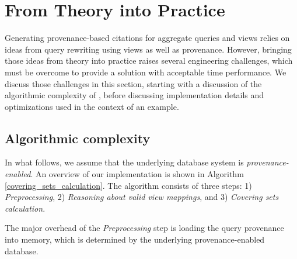 \section{From Theory into Practice}\label{Sec: implementation}
Generating provenance-based citations for aggregate queries and views relies on ideas from query rewriting using views as well as provenance. However, bringing those ideas from theory into practice raises several engineering challenges, which must be overcome to provide a solution with acceptable time performance.  We discuss those challenges in this section, starting with a discussion of the algorithmic complexity of \provalg, before discussing implementation details and optimizations used in the context of an example.


\subsection{Algorithmic complexity}
In what follows, we assume that the underlying database system is \textit{provenance-enabled}. An overview of our implementation is shown in Algorithm \ref{covering_sets_calculation}.  The algorithm consists of three steps: 1) {\em Preprocessing}, 2) {\em Reasoning about valid view mappings}, and 3) {\em Covering sets calculation}. 

The major overhead of the {\em Preprocessing} step is loading the query provenance into memory, which is determined by the underlying provenance-enabled database. 

